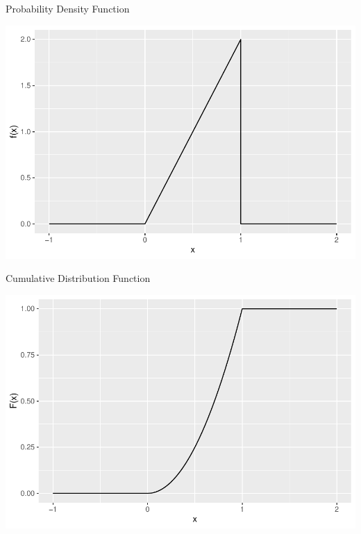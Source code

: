 \begin{frame}
  \begin{block}{\examplectd}
    \begin{center}
      Probability Density Function

      \includegraphics[height=.7\textheight]{figure/example-16-1-1}
    \end{center}
  \end{block}
\end{frame}



\begin{frame}
  \begin{block}{\examplectd}
    \begin{center}
      Cumulative Distribution Function

      \includegraphics[height=.7\textheight]{figure/example-16-2-1}
    \end{center}
  \end{block}
\end{frame}



